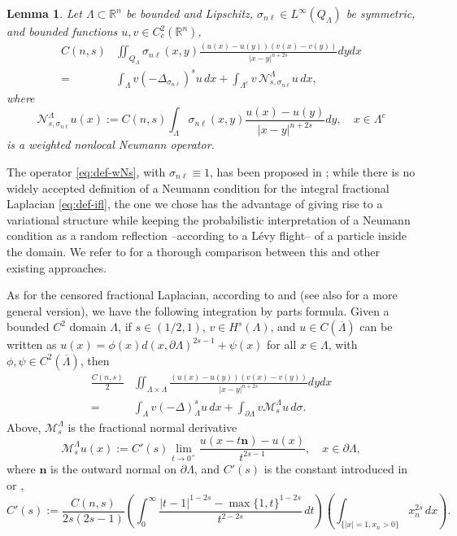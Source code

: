 \documentclass{amsart}
\newcommand{\domain}{\Lambda}
\newcommand{\snl}{{\sigma_{n\ell}}}
\def\vn{{\mathbf n}}
\def\R{{\mathbb R}}
\newcommand{\Ms}{\mathcal{M}_s}
\newcommand{\Nsnl}{\mathcal{N}_{s,\snl}}
\theoremstyle{plain}
\newtheorem{lemma}{Lemma}
\numberwithin{equation}{section}
\numberwithin{table}{section}
\numberwithin{figure}{section}
\numberwithin{theorem}{section}
\numberwithin{corollary}{section}
\numberwithin{definition}{section}
\numberwithin{lemma}{section}
\numberwithin{proposition}{section}
\numberwithin{remark}{section}
\begin{document}
\begin{lemma}\label{lemma:ibp-snl}
Let $\domain \subset \R^n$ be bounded and Lipschitz, $\snl\in L^\infty(Q_\domain)$ be symmetric, and bounded functions $u,v \in C_c^2(\R^n)$,
\begin{equation} \label{eq:wibp}
\begin{split}
C(n,s) & \iint_{Q_\domain} \snl(x,y) \frac{(u(x)-u(y))(v(x)-v(y))}{|x-y|^{n+2s}} dy dx   \\
= &  \int_\domain v (-\Delta_\snl)^s u\,dx + \int_{\domain^c} v\,  \Nsnl^\domain u \,dx,
\end{split}
\end{equation}
where 
\begin{equation} \label{eq:def-wNs}
 \Nsnl^\domain u (x) := C(n,s) \int_\domain \snl(x,y) \frac{u(x)-u(y)}{|x-y|^{n+2s}} dy, \quad x \in \domain^c
\end{equation}
is a weighted nonlocal Neumann operator.
\end{lemma}

The operator \eqref{eq:def-wNs}, with $\snl \equiv 1$, has been proposed in \cite{DiRoVa17}; while there is no widely accepted definition of a Neumann condition for the integral fractional Laplacian \eqref{eq:def-ifl}, the one we chose has the advantage of giving rise to a variational structure while keeping the probabilistic interpretation of a Neumann condition as a random reflection --according to a L\'evy flight--  of a particle inside the domain. We refer to \cite[Section 7]{DiRoVa17} for a thorough comparison between this and other existing approaches.

As for the censored fractional Laplacian, according to \cite[Theorem 3.3]{Guan} and \cite[Theorem 2.7]{GalWarma} (see also \cite[Theorem 5.7]{Warma} for a more general version), we have the following integration by parts formula. Given a bounded $C^{2}$ domain $\domain$, if $s \in (1/2,1)$, $v \in H^s(\domain)$, and $u \in C(\overline\domain)$ can be written as $u (x) = \phi(x) d(x,\partial\domain)^{2s-1} + \psi(x)$ for all $x\in \domain$, with $\phi,\psi \in C^2(\overline\domain)$, then 
\begin{equation} \label{eq:ibp-censored}
\begin{split}
 \frac{C(n,s)}{2} & \iint_{\domain \times \domain} \frac{(u(x)-u(y))(v(x)-v(y))}{|x-y|^{n+2s}} dy dx   \\
= & \int_\domain v (-\Delta)^s_\domain u \,dx + \int_{\partial\domain} v \Ms^\domain u \,d\sigma.
\end{split}\end{equation}
Above, $\Ms^\domain$ is the fractional normal derivative 
\begin{equation} \label{eq:def-Ms}
\Ms^\domain u (x) :=  C'(s) \lim_{t\to 0^+} \frac{u(x-t\vn)-u(x)}{t^{2s-1}}, \quad x \in \partial\domain,
\end{equation}
where $\vn$ is the outward normal on $\partial\domain$, and $C'(s)$ is the constant introduced in \cite[(5.13)-(5.14)]{Warma} or \cite[(3.8)-(3.9)]{Guan}, 
\[
C'(s) := \frac{C(n,s)}{2s(2s-1)} \left(\int_0^\infty \frac{|t-1|^{1-2s} - \max\{1,t\}^{1-2s}}{t^{2-2s}} \, dt \right) \left(\int_{ \{|x|=1, x_n > 0\}} x_n^{2s} \, dx \right).
\]
\end{document}

